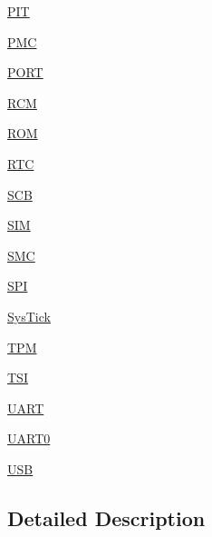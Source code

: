 \begin{DoxyCompactItemize}
\item 
\hyperlink{group___p_i_t___peripheral}{P\+IT}
\item 
\hyperlink{group___p_m_c___peripheral}{P\+MC}
\item 
\hyperlink{group___p_o_r_t___peripheral}{P\+O\+RT}
\item 
\hyperlink{group___r_c_m___peripheral}{R\+CM}
\item 
\hyperlink{group___r_o_m___peripheral}{R\+OM}
\item 
\hyperlink{group___r_t_c___peripheral}{R\+TC}
\item 
\hyperlink{group___s_c_b___peripheral}{S\+CB}
\item 
\hyperlink{group___s_i_m___peripheral}{S\+IM}
\item 
\hyperlink{group___s_m_c___peripheral}{S\+MC}
\item 
\hyperlink{group___s_p_i___peripheral}{S\+PI}
\item 
\hyperlink{group___sys_tick___peripheral}{Sys\+Tick}
\item 
\hyperlink{group___t_p_m___peripheral}{T\+PM}
\item 
\hyperlink{group___t_s_i___peripheral}{T\+SI}
\item 
\hyperlink{group___u_a_r_t___peripheral}{U\+A\+RT}
\item 
\hyperlink{group___u_a_r_t0___peripheral}{U\+A\+R\+T0}
\item 
\hyperlink{group___u_s_b___peripheral}{U\+SB}
\end{DoxyCompactItemize}


\subsection{Detailed Description}
